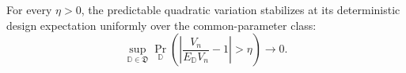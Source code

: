 For every \(\eta>0\), the predictable quadratic variation stabilizes at its deterministic design expectation uniformly over the common-parameter class: \[\sup_{\mathbb D\in\mathfrak D}\Pr_{\mathbb D}\left(\left|\frac{V_n}{E_{\mathbb D}V_n}-1\right|>\eta\right)\longrightarrow0.\]